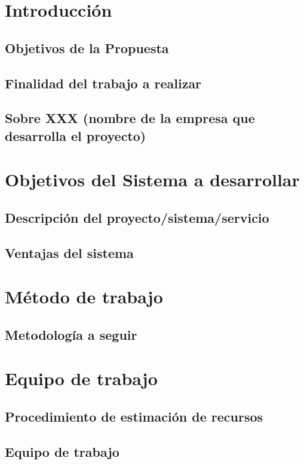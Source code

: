 \documentclass[10pt,a4paper,oldfontcommands]{dpds}
\begin{document}
\pagecolor{fondo}
\color{principal}


\section{Introducción}
\subsection{Objetivos de la Propuesta}
\subsection{Finalidad del trabajo a realizar}
\subsection{Sobre XXX (nombre de la empresa que desarrolla el proyecto)}


\section{Objetivos del Sistema a desarrollar}
\subsection{Descripción del proyecto/sistema/servicio}
\subsection{Ventajas del sistema}


\section{Método de trabajo}
\subsection{Metodología a seguir}



\section{Equipo de trabajo}
\subsection{Procedimiento de estimación de recursos}
\subsection{Equipo de trabajo}
\end{document}
